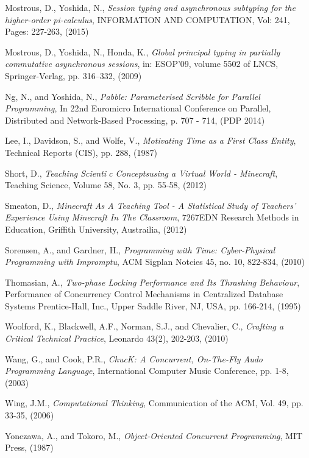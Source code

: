 \documentclass[11pt, abstracton, twoside, titlepage=true]{scrartcl}
\begin{document}
\begin{thebibliography}{9}
  Mostrous, D., Yoshida, N., 
  \emph{Session typing and asynchronous subtyping for the higher-order pi-calculus}, 
  INFORMATION AND COMPUTATION, Vol: 241, 
  Pages: 227-263,
  (2015)

  Mostrous, D., Yoshida, N., Honda, K., 
  \emph{Global principal typing in partially
  commutative asynchronous sessions},
  in: ESOP’09, volume 5502 of
  LNCS, 
  Springer-Verlag, 
  pp. 316–332,
  (2009)

  Ng, N., and Yoshida, N.,
  \emph{Pabble: Parameterised Scribble for Parallel Programming},
  In 22nd Euromicro International Conference on Parallel, Distributed and Network-Based Processing, 
  p. 707 - 714,
  (PDP 2014)

  Lee, I., Davidson, S., and Wolfe, V.,
  \emph{Motivating Time as a First Class Entity},
  Technical Reports (CIS),
  pp. 288,
  (1987)

  Short, D.,
  \emph{Teaching Scientic Conceptsusing a Virtual World - Minecraft},
  Teaching Science,
  Volume 58, No. 3,
  pp. 55-58,
  (2012)

  Smeaton, D.,
  \emph{Minecraft As A Teaching Tool - A Statistical Study of Teachers' Experience Using Minecraft In The Classroom},
  7267EDN Research Methods in Education,
  Griffith University, Austrailia,
  (2012)

  Sorensen, A., and Gardner, H.,
  \emph{Programming with Time: Cyber-Physical Programming with Impromptu},
  ACM Sigplan Notcies 45,
  no. 10, 822-834,
  (2010)

  Thomasian, A.,
  \emph{Two-phase Locking Performance and Its Thrashing Behaviour},
  Performance of Concurrency Control Mechanisms in Centralized Database Systems
  Prentice-Hall, Inc.,
  Upper Saddle River, NJ, USA,
  pp. 166-214,
  (1995)

  Woolford, K., Blackwell, A.F., Norman, S.J., and Chevalier, C.,
  \emph{Crafting a Critical Technical Practice},
  Leonardo 43(2),
  202-203,
  (2010)

  Wang, G., and Cook, P.R.,
  \emph{ChucK: A Concurrent, On-The-Fly Audo Programming Language},
  International Computer Music Conference,
  pp. 1-8,
  (2003)

  Wing, J.M.,
  \emph{Computational Thinking},
  Communication of the ACM,
  Vol. 49, pp. 33-35,
  (2006)

  Yonezawa, A., and Tokoro, M.,
  \emph{Object-Oriented Concurrent Programming},
  MIT Press,
  (1987)

\end{thebibliography}
\end{document}

